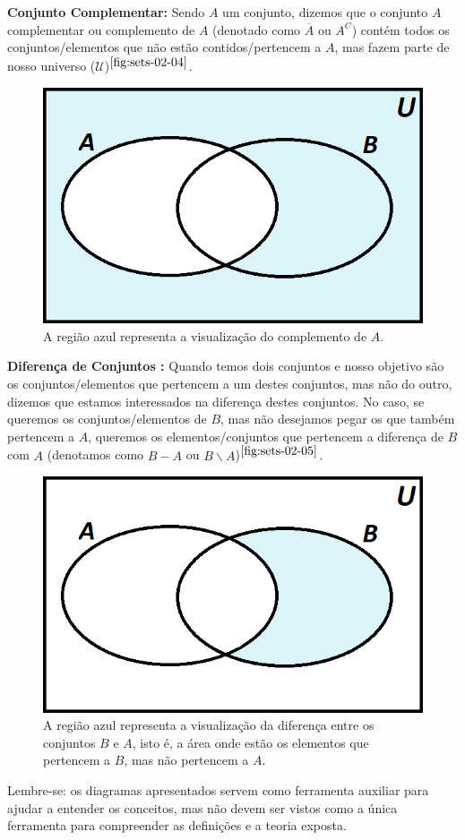 \textbf{Conjunto Complementar:} Sendo $A$ um conjunto, dizemos que o conjunto $A$ complementar ou complemento de $A$ (denotado como $\overline A$ ou $A^C$) contém todos os conjuntos/elementos que não estão contidos/pertencem a $A$, mas fazem parte de nosso universo ($\mathcal U$)$^{\ref{fig:sets-02-04}}$.

\begin{figure}[hbt!]
  \centering
  \includegraphics[width = 7 cm]{figures/sets/fig-sets-02-04.png}
  \caption{A região azul representa a visualização do complemento de $A$.}
  \label{fig:sets-02-04}
\end{figure}

\textbf{Diferença de Conjuntos :} Quando temos dois conjuntos e nosso objetivo são os conjuntos/elementos que pertencem a um destes conjuntos, mas não do outro, dizemos que estamos interessados na diferença destes conjuntos. No caso, se queremos os conjuntos/elementos de $B$, mas não desejamos pegar os que também pertencem a $A$, queremos os elementos/conjuntos que pertencem a diferença de $B$ com $A$ (denotamos como $B-A$ ou $B \backslash A$)$^{\ref{fig:sets-02-05}}$.

\begin{figure}[hbt!]
  \centering
  \includegraphics[width = 7 cm]{figures/sets/fig-sets-02-05.png}
  \caption{A região azul representa a visualização da diferença entre os conjuntos $B$ e $A$, isto é, a área onde estão os elementos que pertencem a $B$, mas não pertencem a $A$.}
  \label{fig:sets-02-05}
\end{figure}

Lembre-se: os diagramas apresentados servem como ferramenta auxiliar para ajudar a entender os conceitos, mas não devem ser vistos como a única ferramenta para compreender as definições e  a teoria exposta.

